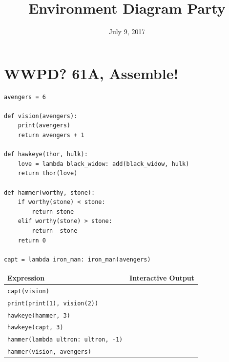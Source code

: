 \documentclass{exam}
\title{Environment Diagram Party}
\date{July 9, 2017}
\begin{document}
\maketitle

\section{WWPD? 61A, Assemble!}
\begin{lstlisting}
avengers = 6

def vision(avengers):
    print(avengers)
    return avengers + 1
    
def hawkeye(thor, hulk):
    love = lambda black_widow: add(black_widow, hulk)
    return thor(love)
    
def hammer(worthy, stone):
    if worthy(stone) < stone:
        return stone
    elif worthy(stone) > stone:
        return -stone
    return 0
    
capt = lambda iron_man: iron_man(avengers)
\end{lstlisting}

\vspace{0.1in}
\ifprintanswers\else
\begin{center}
\begin{tabular}{|m{8cm}|m{6cm}|}
\hline
\textbf{Expression} & \textbf{Interactive Output} \\
\hline
\lstinline$capt(vision)$ & \\ [2.5em]
\hline
\lstinline$print(print(1), vision(2))$ & \\ [2.5em]
\hline
\lstinline$hawkeye(hammer, 3)$ & \\ [2.5em]
\hline
\lstinline$hawkeye(capt, 3)$ & \\ [2.5em]
\hline
\lstinline$hammer(lambda ultron: ultron, -1)$ & \\ [2.5em]
\hline
\lstinline$hammer(vision, avengers)$ & \\ [2.5em]
\hline
\end{tabular}
\end{center}
\fi
\end{document}
